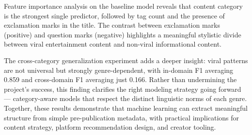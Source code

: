 \documentclass[12pt,a4paper]{article}
\begin{document}
Feature importance analysis on the baseline model reveals that content category
is the strongest single predictor, followed by tag count and the presence of
exclamation marks in the title.  The contrast between exclamation marks
(positive) and question marks (negative) highlights a meaningful stylistic
divide between viral entertainment content and non-viral informational content.

The cross-category generalization experiment adds a deeper insight: viral
patterns are not universal but strongly genre-dependent, with in-domain F1
averaging 0.859 and cross-domain F1 averaging just 0.166.  Rather than
undermining the project's success, this finding clarifies the right modeling
strategy going forward --- category-aware models that respect the distinct
linguistic norms of each genre.  Together, these results demonstrate that
machine learning can extract meaningful structure from simple pre-publication
metadata, with practical implications for content strategy, platform
recommendation design, and creator tooling.
\end{document}
